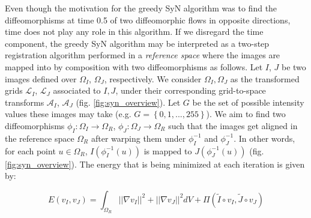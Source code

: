 Even though the motivation for the greedy SyN algorithm was to find the diffeomorphisms at time 0.5 of two diffeomorphic flows in opposite directions, time does not play
any role in this algorithm. If we disregard the time component, the greedy SyN algorithm may be interpreted as a two-step registration algorithm performed in a
\textit{reference space} where the images are mapped into by composition with two diffeomorphisms as follows. Let $I$, $J$ be two images defined over $\Omega_{I}$, $\Omega_{J}$,
respectively. We consider $\Omega_{I}, \Omega_{J}$ as the transformed grids $\mathcal{L}_{I}$, $\mathcal{L}_{J}$ associated to $I, J$, under their corresponding grid-to-space
transforms $\mathcal{A}_{I}$, $\mathcal{A}_{J}$ (fig. \ref{fig:syn_overview}). Let $G$ be the set of possible intensity values these images may take
(e.g. $G=\left\lbrace 0,1,...,255\right\rbrace$). We aim to find two diffeomorphisms
$\phi_{I}:\Omega_{I}\rightarrow \Omega_{R}$, $\phi_{J}:\Omega_{J}\rightarrow \Omega_{R}$ such that the images get aligned in the reference space $\Omega_{R}$
after warping them under $\phi_{I}^{-1}$ and $\phi_{J}^{-1}$. In other words, for each point $u \in \Omega_{R}$, $I(\phi_{I}^{-1}(u))$ is mapped to $J(\phi_{J}^{-1}(u))$
(fig. \ref{fig:syn_overview}). The energy that is being minimized at each iteration is given by:

\begin{equation}\label{eq:greedy_syn_energy}
    E(v_{I}, v_{J}) = \int_{\Omega_{R}} ||\nabla v_{I}||^{2}+||\nabla v_{J}||^{2}dV + \Pi(\tilde{I}\circ v_{I}, \tilde{J}\circ v_{J})
\end{equation}











